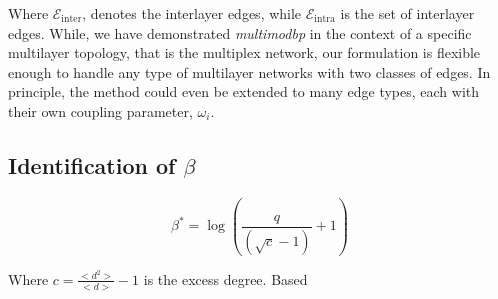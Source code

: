 \documentclass[11pt]{article}
\begin{document}


Where $\mathcal{E}_{\text{inter}}$, denotes the interlayer edges, while $\mathcal{E}_{\text{intra}}$ is the set of interlayer edges.  While, we have demonstrated \textit{multimodbp} in the context of a specific multilayer topology, that is the multiplex network, our formulation is flexible enough to handle any type of multilayer networks with two classes of edges.  In principle, the method could even be extended to many edge types, each with their own coupling parameter, $\omega_i$.  

\subsection{Identification of $\beta$}



\begin{equation} \label{eq:bstar}
\beta^*=\log\left(\frac{q}{(\sqrt{c}-1)}+1\right)
\end{equation}

Where $c=\frac{<d^2>}{<d>}-1$ is the excess degree.  Based 


\printbibliography

\end{document}
